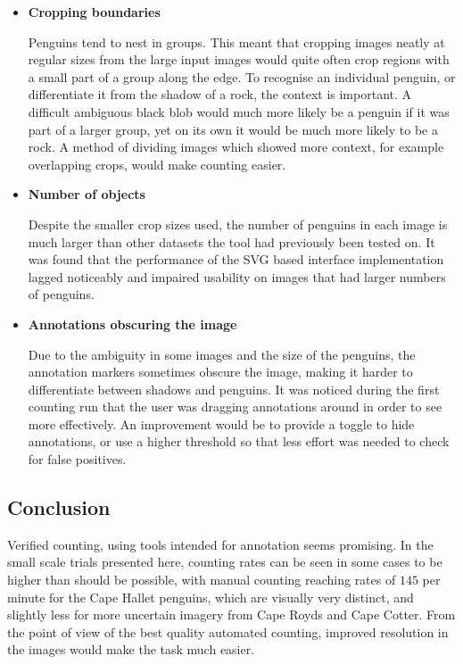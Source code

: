 \begin{itemize}
    \item {\textbf{Cropping boundaries}}\par
Penguins tend to nest in groups. This meant that cropping images neatly at regular sizes from the large input images would quite often crop regions with a small part of a group along the edge. To recognise an individual penguin, or differentiate it from the shadow of a rock, the context is important. A difficult ambiguous black blob would much more likely be a penguin if it was part of a larger group, yet on its own it would be much more likely to be a rock. A method of dividing images which showed more context, for example overlapping crops, would make counting easier.
    \item {\textbf{Number of objects}}\par
Despite the smaller crop sizes used, the number of penguins in each image is much larger than other datasets the tool had previously been tested on. It was found that the performance of the \gls{SVG} based interface implementation lagged noticeably and impaired usability on images that had larger numbers of penguins. 
    \item {\textbf{Annotations obscuring the image}}\par
Due to the ambiguity in some images and the size of the penguins,  the annotation markers sometimes obscure the image, making it harder to differentiate between shadows and penguins. It was noticed during the first counting run that the user was dragging annotations around in order to see more effectively. An improvement would be to provide a toggle to hide annotations, or use a higher threshold so that less effort was needed to check for false positives.

\end{itemize}


\subsection{Conclusion}
\label{sec:penguin_conclusion}

Verified counting, using tools intended for annotation seems promising. In the small scale trials presented here, counting rates can be seen in some cases to be higher than should be possible, with manual counting reaching rates of $145$ per minute for the Cape Hallet penguins, which are visually very distinct, and slightly less for more uncertain imagery from Cape Royds and Cape Cotter. From the point of view of the best quality automated counting, improved resolution in the images would make the task much easier. 


